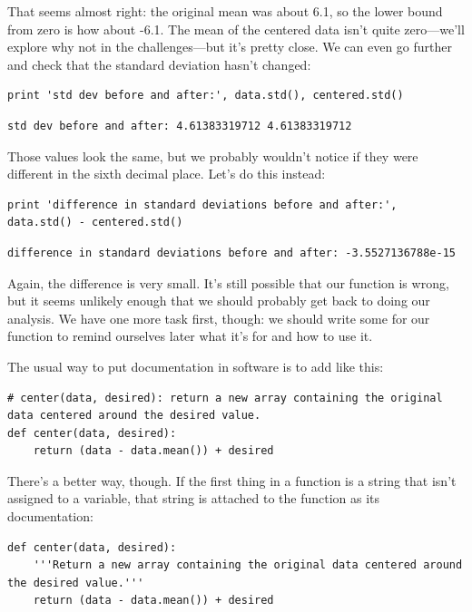\documentclass{book}
\begin{document}
That seems almost right: the original mean was about 6.1, so the lower
bound from zero is how about -6.1. The mean of the centered data isn't
quite zero---we'll explore why not in the challenges---but it's pretty
close. We can even go further and check that the standard deviation
hasn't changed:

\begin{verbatim}
print 'std dev before and after:', data.std(), centered.std()
\end{verbatim}

\begin{verbatim}
std dev before and after: 4.61383319712 4.61383319712
\end{verbatim}

Those values look the same, but we probably wouldn't notice if they were
different in the sixth decimal place. Let's do this instead:

\begin{verbatim}
print 'difference in standard deviations before and after:', data.std() - centered.std()
\end{verbatim}

\begin{verbatim}
difference in standard deviations before and after: -3.5527136788e-15
\end{verbatim}

Again, the difference is very small. It's still possible that our
function is wrong, but it seems unlikely enough that we should probably
get back to doing our analysis. We have one more task first, though: we
should write some  for our
function to remind ourselves later what it's for and how to use it.

The usual way to put documentation in software is to add
 like this:

\begin{verbatim}
# center(data, desired): return a new array containing the original data centered around the desired value.
def center(data, desired):
    return (data - data.mean()) + desired
\end{verbatim}

There's a better way, though. If the first thing in a function is a
string that isn't assigned to a variable, that string is attached to the
function as its documentation:

\begin{verbatim}
def center(data, desired):
    '''Return a new array containing the original data centered around the desired value.'''
    return (data - data.mean()) + desired
\end{verbatim}
\end{document}
